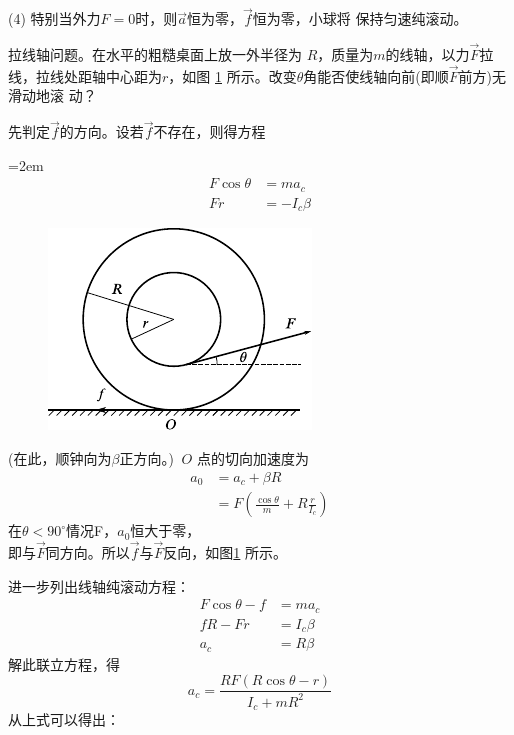 (4) 特别当外力$ F=0 $时，则$ \vec{a} $恒为零，$ \vec{f} $恒为零，小球将
保持匀速纯滚动。

\example 拉线轴问题。在水平的粗糙桌面上放一外半径为
$ R $，质量为$ m $的线轴，以力$ \vec{F} $拉线，拉线处距轴中心距为$ r $，如图
\ref{fig:10.19} 所示。改变$ \theta $角能否使线轴向前(即顺$ \vec{F} $前方)无滑动地滚
动？

\solution 先判定$ \vec{f} $的方向。设若$ \vec{f} $不存在，则得方程

\clearpage
\begingroup
\mathindent=2em
\begin{equation*}
    \begin{split}
        F \cos \theta &= m a _ c \\
        F r &= - I _ { c } \beta
    \end{split}
\end{equation*}
\begin{figure}
    \vspace{-4em}
    \centering
    \includegraphics{figure/fig10.19}
    \caption{}
    \label{fig:10.19}
\end{figure}
(在此，顺钟向为$ \beta $正方向。\!\!) $~ O $
点的切向加速度为
\begin{equation*}
    \begin{split}
        a _ { 0 } &= a _ { c } + \beta R \\
                  &= F \left( \frac { \cos \theta } { m } + R \frac { r } { I _ { c } } \right)
    \end{split}
\end{equation*}
\endgroup
在$ \theta < 90 ^ \circ $情况F，$ a _ 0 $恒大于零，\\
即与$ \vec{F} $同方向。所以$\vec{f}$与$\vec{F}$反向，如图\ref{fig:10.19} 所示。

进一步列出线轴纯滚动方程：
\begin{equation*}
    \begin{split}
        F \cos \theta - f &= m a _ { c } \\
        f R - F r &= I _ { c } \beta \\
        a _ { c } &= R \beta
    \end{split}
\end{equation*}
解此联立方程，得
\begin{equation*}
    a _ { c } = \frac { R F \left( R \cos \theta - r \right) } { I _ { c } + m R ^ { 2 } }
\end{equation*}
从上式可以得出：

